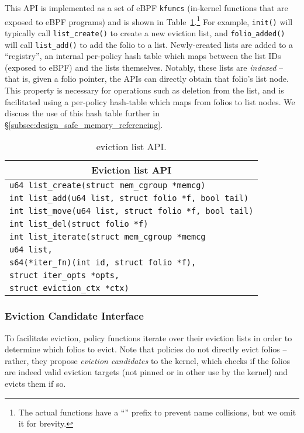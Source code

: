 This API is implemented as a set of eBPF \texttt{kfuncs} (in-kernel functions that are exposed to eBPF programs) and is shown in Table~\ref{table:cache-ext-eviction-lists-api}.\footnote{The actual functions have a ``\name'' prefix to prevent name collisions, but we omit it for brevity.}
For example, \texttt{init()} will typically call \texttt{list\_create()} to create a new eviction list, and \texttt{folio\_added()} will call \texttt{list\_add()} to add the folio to a list. Newly-created lists are added to a ``registry'', an internal per-policy hash table which maps between the list IDs (exposed to eBPF) and the lists themselves. Notably, these lists are \emph{indexed} -- that is, given a folio pointer, the APIs can directly obtain that folio's list node. This property is necessary for operations such as deletion from the list, and is facilitated using a per-policy hash-table which maps from folios to list nodes. We discuss the use of this hash table further in \S\ref{subsec:design_safe_memory_referencing}.


\begin{table}[t!]
\centering
\small
\begin{tabular}{|p{}|}
\hline
\multicolumn{1}{|c|}{\textbf{Eviction list API}} \\
\hline
\texttt{u64 list\_create(struct mem\_cgroup *memcg)}\\
\hline
\texttt{int list\_add(u64 list, struct folio *f, bool tail)}\\
\hline
\texttt{int list\_move(u64 list, struct folio *f, bool tail)}\\

\hline
\texttt{int list\_del(struct folio *f)}\\
\hline
\texttt{int list\_iterate(struct mem\_cgroup *memcg}\\
\texttt{\quad u64 list,}\\
\texttt{\quad s64(*iter\_fn)(int id, struct folio *f),}\\
\texttt{\quad struct iter\_opts *opts,} \\
\texttt{\quad struct eviction\_ctx *ctx)} \\
\hline
\end{tabular}
\caption{\name eviction list API.}
\label{table:cache-ext-eviction-lists-api}
\end{table}


\subsubsection{Eviction Candidate Interface}
\label{subsubsec:eviction-interface}
To facilitate eviction, policy functions iterate over their eviction lists in order to determine which folios to evict. Note that policies do not directly evict folios -- rather, they propose \emph{eviction candidates} to the kernel, which checks if the folios are indeed valid eviction targets (\ie not pinned or in other use by the kernel) and evicts them if so.

